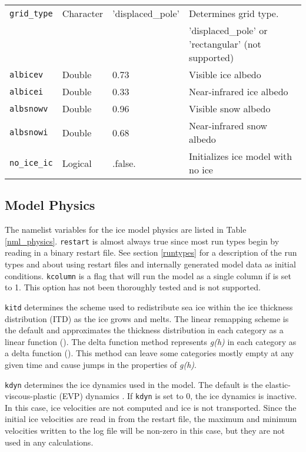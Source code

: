 \begin{table}
\begin{center}
\begin{tabular}{p{3cm}p{2.0cm}p{3cm}p{6.5cm}}
{\tt grid\_type} &  Character & 'displaced\_pole' &  Determines grid type. \\
          &            &   &  'displaced\_pole' or 'rectangular' (not supported) \\

{\tt albicev} &  Double & 0.73 &  Visible ice albedo \\

{\tt albicei} &  Double & 0.33 &  Near-infrared ice albedo \\

{\tt albsnowv} &  Double & 0.96 &  Visible snow albedo \\

{\tt albsnowi} &  Double & 0.68 &  Near-infrared snow albedo \\

{\tt no\_ice\_ic} & Logical & .false. &  Initializes ice model with no ice \\
 
  \hline
  \end{tabular}
  \end{center}
\end{table}

\subsection{Model Physics}

The namelist variables for the ice model physics are listed in Table 
\ref{nml_physics}.  {\tt restart} is almost always true since most
run types begin by reading in a binary restart file.  See section 
\ref{runtypes} for a description of the run types and about using
restart files and internally generated model data as initial conditions.
{\tt kcolumn} is a flag that will run the model as a single column if is
set to 1.  This option has not been thoroughly tested and is not supported. 

{\tt kitd} determines the scheme used to redistribute sea ice within the ice thickness
distribution (ITD) as the ice grows and melts.  The linear remapping scheme is the
default and approximates the thickness distribution in each category as a linear 
function (\cite{lips01}).  The delta function method represents {\it g(h)} in
each category as a delta function (\cite{bitz01}).  This method can leave some
categories mostly empty at any given time and cause jumps in the properties of
{\it g(h)}.

{\tt kdyn} determines the ice dynamics used in the model.  The default is the
elastic-viscous-plastic (EVP) dynamics \cite{hunk97}.  If {\tt kdyn} is set to 0,
the ice dynamics is inactive. In this case, ice velocities are not computed
and ice is not transported.  Since the initial ice velocities are read in
from the restart file, the maximum and minimum velocities written to the 
log file will be non-zero in this case, but they are not used in any calculations.

